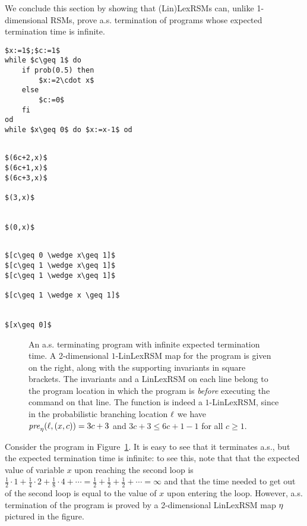 We conclude this section by showing that (Lin)LexRSMs can, unlike 1-dimensional 
RSMs, prove a.s. 
termination of programs whose expected termination time is infinite.
\lstset{language=affprob}
\lstset{tabsize=2,escapechar=\&}
\newsavebox{\infas}
\begin{lrbox}{\infas}
	\begin{lstlisting}[mathescape]
$x:=1$;$c:=1$ 
while $c\geq 1$ do				
	if prob(0.5) then			
		$x:=2\cdot x$			
	else						
		$c:=0$					
	fi							
od								
while $x\geq 0$ do $x:=x-1$ od	
	\end{lstlisting}
\end{lrbox}
\newsavebox{\infast}
\begin{lrbox}{\infast}
	\begin{lstlisting}[mathescape]

$(6c+2,x)$
$(6c+1,x)$
$(6c+3,x)$

$(3,x)$


$(0,x)$	
	\end{lstlisting}
\end{lrbox}
\newsavebox{\infastinv}
\begin{lrbox}{\infastinv}
	\begin{lstlisting}[mathescape]

$[c\geq 0 \wedge x\geq 1]$
$[c\geq 1 \wedge x\geq 1]$
$[c\geq 1 \wedge x\geq 1]$

$[c\geq 1 \wedge x \geq 1]$


$[x\geq 0]$	
	\end{lstlisting}
\end{lrbox}
\begin{figure}[t]
	\centering
	\usebox{\infas}
	\hspace{0.1cm}
	\usebox{\infast}
	\hspace{0.1cm}
	\usebox{\infastinv}
\caption{An a.s. terminating program with infinite expected termination time. A 
2-dimensional $1$-LinLexRSM map for the program is given on the right, along 
with the 
supporting invariants in square brackets. The invariants and a LinLexRSM on 
each 
line belong to the program location in which the program is \emph{before} 
executing the command on that line. The function is indeed a $1$-LinLexRSM, 
since in the probabilistic branching location $\ell$ we have 
$\mathit{pre}_{\eta}(\ell,(x,c))=3c+3$ and $3c+3\leq 6c+1-1$ for all $c\geq 1$.} 
\label{fig:inftime}
\end{figure}

\begin{example}
\label{ex:infinite-time}
Consider the program in Figure~\ref{fig:inftime}. It is easy to see that it 
terminates a.s., but the expected termination time is infinite: to see this, 
note that that the expected value of variable $x$ upon reaching the second loop 
is $\frac{1}{2}\cdot 1 + \frac{1}{4}\cdot 2 + \frac{1}{8}\cdot 4 + \cdots = 
\frac{1}{2}+\frac{1}{2}+\frac{1}{2}+\cdots=\infty$ and that the time needed to 
get out of the second loop is equal to the value of $x$ upon entering the loop. 
However, a.s. termination of the program is proved by a 2-dimensional LinLexRSM 
map
$\eta$ pictured in the figure.
\end{example}

